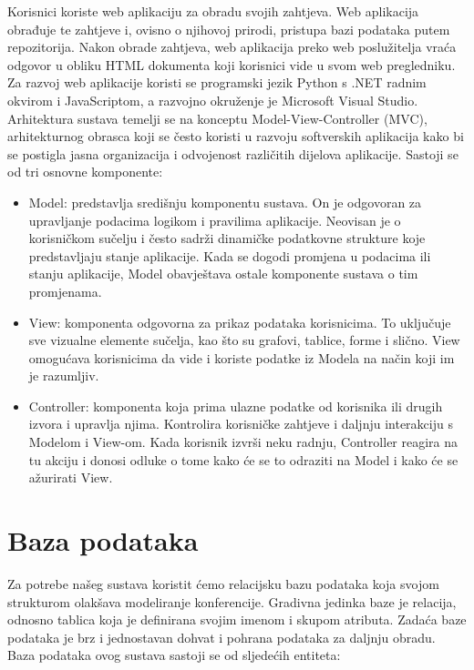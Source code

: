 		Korisnici koriste web aplikaciju za obradu svojih zahtjeva. Web aplikacija obrađuje te zahtjeve i, ovisno o njihovoj prirodi, pristupa bazi podataka putem repozitorija. Nakon obrade zahtjeva, web aplikacija preko web poslužitelja vraća odgovor u obliku HTML dokumenta koji korisnici vide u svom web pregledniku. Za razvoj web aplikacije koristi se programski jezik Python s .NET radnim okvirom i JavaScriptom, a razvojno okruženje je Microsoft Visual Studio. Arhitektura sustava temelji se na konceptu Model-View-Controller (MVC), arhitekturnog obrasca koji se često koristi u razvoju softverskih aplikacija kako bi se postigla jasna organizacija i odvojenost različitih dijelova aplikacije. Sastoji se od tri osnovne komponente:
	\begin{itemize}
		\item {Model: predstavlja središnju komponentu sustava. On je odgovoran za upravljanje podacima logikom i pravilima aplikacije. Neovisan je o korisničkom sučelju i često sadrži dinamičke podatkovne strukture koje predstavljaju stanje aplikacije. Kada se dogodi promjena u podacima ili stanju aplikacije, Model obavještava ostale komponente sustava o tim promjenama.}
		\item {View: komponenta odgovorna za prikaz podataka korisnicima. To uključuje sve vizualne elemente sučelja, kao što su grafovi, tablice, forme i slično. View omogućava korisnicima da vide i koriste podatke iz Modela na način koji im je razumljiv.}
		\item {Controller: komponenta koja prima ulazne podatke od korisnika ili drugih izvora i upravlja njima. Kontrolira korisničke zahtjeve i daljnju interakciju s Modelom i View-om. Kada korisnik izvrši neku radnju, Controller reagira na tu akciju i donosi odluke o tome kako će se to odraziti na Model i kako će se ažurirati View.}
	\end{itemize}

	
\section{Baza podataka}
					
	Za potrebe našeg sustava koristit ćemo relacijsku bazu podataka koja svojom strukturom olakšava modeliranje konferencije. Gradivna jedinka baze je 				relacija, odnosno tablica koja je definirana svojim imenom i skupom atributa. Zadaća baze podataka je brz i jednostavan dohvat i pohrana podataka za 			daljnju obradu. Baza podataka ovog sustava sastoji se od sljedećih entiteta:

